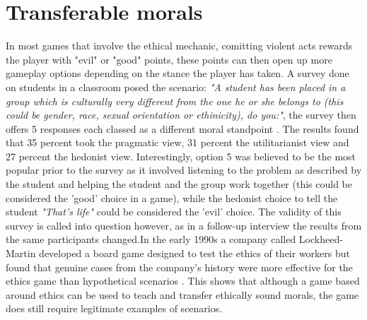 \documentclass[12pt]{article}
\begin{document}
\section{Transferable morals}
In most games that involve the ethical mechanic, comitting violent acts rewards the player with "evil" or "good" points, these points can then open up more gameplay options depending on the stance the player has taken. A survey done on students in a classroom posed the scenario: \textit{"A student has been placed in a group which is culturally very different from the one he or she belongs to (this could be gender, race, sexual orientation or ethinicity), do you:"}, the survey then offers 5 responses each classed as a different moral standpoint \cite{7942917}. The results found that 35 percent took the pragmatic view, 31 percent the utilitarianist view and 27 percent the hedonist view. Interestingly, option 5 was believed to be the most popular prior to the survey as it involved listening to the problem as described by the student and helping the student and the group work together (this could be considered the 'good' choice in a game), while the hedonist choice to tell the student \textit{"That's life"} could be considered the 'evil' choice. The validity of this survey is called into question however, as in a follow-up interview the results from the same participants changed.In the early 1990s a company called Lockheed-Martin developed a board game designed to test the ethics of their workers but found that genuine cases from the company's history were more effective for the ethics game than hypothetical scenarios \cite{4408567}. This shows that although a game based around ethics can be used to teach and transfer ethically sound morals, the game does still require legitimate examples of scenarios.
\end{document}
